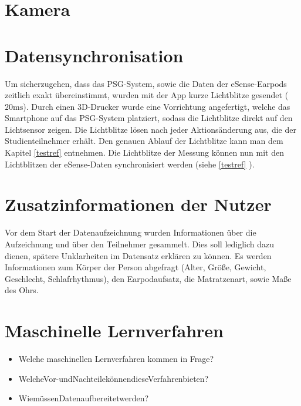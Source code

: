 \section{Kamera}
\label{ch:sa:camera}

\section{Datensynchronisation}
\label{ch:sa:data_synchronisation}
Um sicherzugehen, dass das PSG-System, sowie die Daten der eSense-Earpods zeitlich exakt übereinstimmt, wurden mit der App kurze Lichtblitze gesendet ($20 \si{\ms}$).
Durch einen 3D-Drucker wurde eine Vorrichtung angefertigt, welche das Smartphone auf das PSG-System platziert, sodass die Lichtblitze direkt auf den Lichtsensor zeigen.
Die Lichtblitze lösen nach jeder Aktionsänderung aus, die der Studienteilnehmer erhält. 
Den genauen Ablauf der Lichtblitze kann man dem Kapitel \ref{testref} entnehmen.
Die Lichtblitze der Messung können nun mit den Lichtblitzen der eSense-Daten synchronisiert werden (siehe \ref{testref} ).

\section{Zusatzinformationen der Nutzer}
\label{ch:sa:additionalUserStudiesInformation}
Vor dem Start der Datenaufzeichnung wurden Informationen über die Aufzeichnung und über den Teilnehmer gesammelt. 
Dies soll lediglich dazu dienen, spätere Unklarheiten im Datensatz erklären zu können.
Es werden Informationen zum Körper der Person abgefragt (Alter, Größe, Gewicht, Geschlecht, Schlafrhythmus), den Earpodaufsatz, die Matratzenart, sowie Maße des Ohrs.


\section{Maschinelle Lernverfahren}
\label{ch:sa:machine_learning}
\begin{itemize}
    \item Welche maschinellen Lernverfahren kommen in Frage?
    \item WelcheVor-undNachteilekönnendieseVerfahrenbieten? 
    \item WiemüssenDatenaufbereitetwerden?
\end{itemize}

